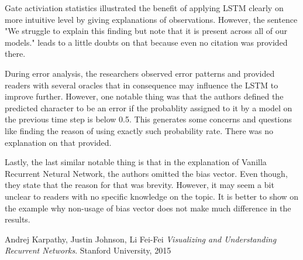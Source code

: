 \documentclass{IEEEtran}
\begin{document}
Gate activiation statistics illustrated the benefit of applying LSTM clearly on more intuitive level by giving explanations of observations. However, the sentence "We struggle to explain this finding but note that it is present across all of our models." leads to a little doubts on that because even no citation was provided there.

During error analysis, the researchers observed error patterns and provided readers with several oracles that in consequence may influence the LSTM to improve further. However, one notable thing was that the authors defined the predicted character to be an error if the probablity assigned to it by a model on the previous time step is below 0.5. This generates some concerns and questions like finding the reason of using exactly such probability rate. There was no explanation on that provided.

Lastly, the last similar notable thing is that in the explanation of Vanilla Recurrent Netural Network, the authors omitted the bias vector. Even though, they state that the reason for that was brevity. However, it may seem a bit unclear to readers with no specific knowledge on the topic. It is better to show on the example why non-usage of bias vector does not make much difference in the results.




\begin{thebibliography}{1}

\bibitem{}
Andrej Karpathy, Justin Johnson, Li Fei-Fei \emph{Visualizing and Understanding Recurrent Networks}.
Stanford University, 2015

\end{thebibliography}
\end{document}
